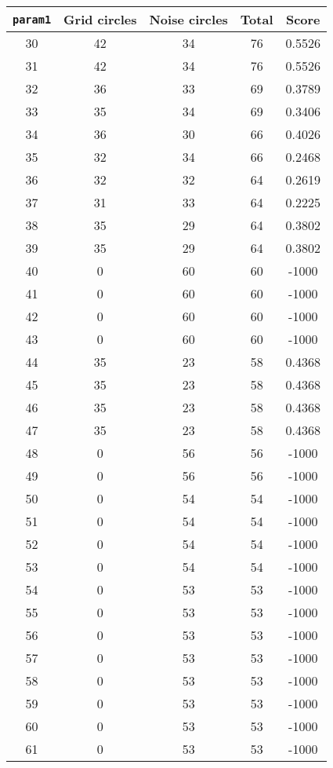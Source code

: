 \documentclass[letterpaper, 12pt]{article}
\begin{document}
\begin{longtable}{|c|c|c|c|c|}
\hline
\textbf{\texttt{param1}} & \textbf{Grid circles} & \textbf{Noise circles} & \textbf{Total} & \textbf{Score} \\
\hline
30 & 42 & 34 & 76 & 0.5526 \\
\hline
31 & 42 & 34 & 76 & 0.5526 \\
\hline
32 & 36 & 33 & 69 & 0.3789 \\
\hline
33 & 35 & 34 & 69 & 0.3406 \\
\hline
34 & 36 & 30 & 66 & 0.4026 \\
\hline
35 & 32 & 34 & 66 & 0.2468 \\
\hline
36 & 32 & 32 & 64 & 0.2619 \\
\hline
37 & 31 & 33 & 64 & 0.2225 \\
\hline
38 & 35 & 29 & 64 & 0.3802 \\
\hline
39 & 35 & 29 & 64 & 0.3802 \\
\hline
40 & 0 & 60 & 60 & -1000 \\
\hline
41 & 0 & 60 & 60 & -1000 \\
\hline
42 & 0 & 60 & 60 & -1000 \\
\hline
43 & 0 & 60 & 60 & -1000 \\
\hline
44 & 35 & 23 & 58 & 0.4368 \\
\hline
45 & 35 & 23 & 58 & 0.4368 \\
\hline
46 & 35 & 23 & 58 & 0.4368 \\
\hline
47 & 35 & 23 & 58 & 0.4368 \\
\hline
48 & 0 & 56 & 56 & -1000 \\
\hline
49 & 0 & 56 & 56 & -1000 \\
\hline
50 & 0 & 54 & 54 & -1000 \\
\hline
51 & 0 & 54 & 54 & -1000 \\
\hline
52 & 0 & 54 & 54 & -1000 \\
\hline
53 & 0 & 54 & 54 & -1000 \\
\hline
54 & 0 & 53 & 53 & -1000 \\
\hline
55 & 0 & 53 & 53 & -1000 \\
\hline
56 & 0 & 53 & 53 & -1000 \\
\hline
57 & 0 & 53 & 53 & -1000 \\
\hline
58 & 0 & 53 & 53 & -1000 \\
\hline
59 & 0 & 53 & 53 & -1000 \\
\hline
60 & 0 & 53 & 53 & -1000 \\
\hline
61 & 0 & 53 & 53 & -1000 \\

\end{longtable}
\end{document}
